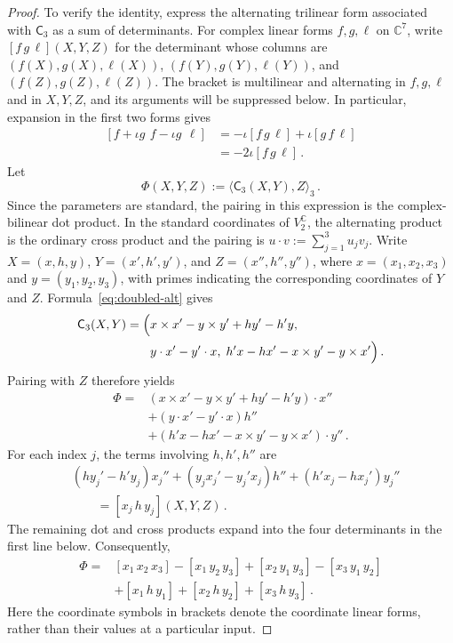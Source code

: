 \documentclass[11pt,reqno]{amsart}
\numberwithin{equation}{section}
\newcommand{\C}{\mathbb C}
\newcommand{\AltC}{\mathsf C}
\begin{document}
\begin{proof}
To verify the identity, express the alternating trilinear form associated
with $\AltC_3$ as a sum of determinants. For complex linear forms
$f,g,\ell$ on $\C^7$, write $[f\,g\,\ell](X,Y,Z)$ for the determinant
whose columns are $(f(X),g(X),\ell(X))$, $(f(Y),g(Y),\ell(Y))$, and
$(f(Z),g(Z),\ell(Z))$. The bracket is multilinear and alternating in
$f,g,\ell$ and in $X,Y,Z$, and its arguments will be suppressed below.
In particular, expansion in the first two forms gives
\[
\begin{aligned}
[f+\iota g\,\ f-\iota g\,\ \ell]
&=-\iota[f\,g\,\ell]+\iota[g\,f\,\ell]\\
&=-2\iota[f\,g\,\ell]\,.
\end{aligned}
\]
Let
\[
\Phi(X,Y,Z):=\langle\AltC_3(X,Y),Z\rangle_3\,.
\]
Since the parameters are standard, the pairing in this expression is
the complex-bilinear dot product. In the standard coordinates of
$V_2^{\C}$, the alternating product is the ordinary cross product and
the pairing is $u\cdot v:=\sum_{j=1}^3u_jv_j$. Write
$X=(x,h,y)$, $Y=(x',h',y')$, and $Z=(x'',h'',y'')$, where
$x=(x_1,x_2,x_3)$ and $y=(y_1,y_2,y_3)$, with primes indicating the
corresponding coordinates of $Y$ and $Z$. Formula~\eqref{eq:doubled-alt}
gives
\[
\begin{aligned}
\AltC_3(X,Y)=\Bigl(&x\times x'-y\times y'+hy'-h'y,\;\\
&y\cdot x'-y'\cdot x,\;
h'x-hx'-x\times y'-y\times x'\Bigr)\,.
\end{aligned}
\]
Pairing with $Z$ therefore yields
\[
\begin{aligned}
\Phi={}&(x\times x'-y\times y'+hy'-h'y)\cdot x''\\
&+(y\cdot x'-y'\cdot x)h''\\
&+(h'x-hx'-x\times y'-y\times x')\cdot y''\,.
\end{aligned}
\]
For each index $j$, the terms involving $h,h',h''$ are
\[
\begin{aligned}
&(hy_j'-h'y_j)x_j''
 +(y_jx_j'-y_j'x_j)h''
 +(h'x_j-hx_j')y_j''\\
&\qquad=[x_j\,h\,y_j](X,Y,Z)\,.
\end{aligned}
\]
The remaining dot and cross products expand into the four determinants
in the first line below. Consequently,
\begin{equation}\label{eq:octonion-three-form}
\begin{aligned}
\Phi={}&[x_1\,x_2\,x_3]-[x_1\,y_2\,y_3]
       +[x_2\,y_1\,y_3]-[x_3\,y_1\,y_2]\\
&+[x_1\,h\,y_1]+[x_2\,h\,y_2]+[x_3\,h\,y_3]\,.
\end{aligned}
\end{equation}
Here the coordinate symbols in brackets denote the coordinate linear
forms, rather than their values at a particular input.


\end{proof}
\end{document}
